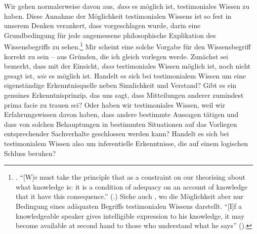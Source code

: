 Wir gehen normalerweise davon aus, \emph{dass} es möglich ist, testimoniales
Wissen zu haben. Diese Annahme der Möglichkeit testimonialen
Wissens ist so fest in unserem Denken verankert, dass vorgeschlagen wurde, darin
eine Grundbedingung für jede angemessene philosophische Explikation des
Wissensbegriffs zu
sehen.\footnote{\label{Fussnote:WissensbegriffunddasZeugnisanderer}\cite[Siehe][57--58,
63]{Fricker:TheEpistemologyofTestimony1987}. \enquote{[W]e must
take the principle that  as a
constraint on our theorising about what knowledge is: it is a condition of
adequacy on an account of knowledge that it have this consequence.}
(\cite[][\pno~57\,f.]{Fricker:TheEpistemologyofTestimony1987}.) Siehe auch
\cite[][198]{McDowell:KnowledgebyHearsay1994}, wo die Möglichkeit aber nur
Bedingung eines adäquaten Begriffs testimonialen Wissens darstellt.
\enquote{[I]f a knowledgeable speaker gives intelligible expression to his
knowledge, it may become available at second hand to those who understand what
he says} (\cite[][417]{McDowell:KnowledgebyHearsay1994}).} Mir scheint eine
solche Vorgabe für den Wissensbegriff korrekt zu sein -- aus Gründen, die ich
gleich vorlegen werde. Zunächst sei bemerkt, dass mit der Einsicht, \emph{dass}
testimoniales Wissen möglich ist, noch nicht gesagt ist, \emph{wie} es möglich
ist. Handelt es sich bei testimonialem Wissen um eine eigenständige
Erkenntnisquelle neben Sinnlichkeit und Verstand? Gibt es ein
genuines Erkenntnisprinzip, das uns sagt, dass Mitteilungen anderer zumindest
prima facie zu trauen sei? Oder haben wir testimoniales Wissen, weil wir
Erfahrungswissen davon haben, dass andere bestimmte Aussagen tätigen und dass
von solchen Behauptungen in bestimmten Situationen auf das Vorliegen
entsprechender Sachverhalte geschlossen werden kann? Handelt es sich bei
testimonialem Wissen also um inferentielle Erkenntnisse, die auf einem logischen
Schluss beruhen?

